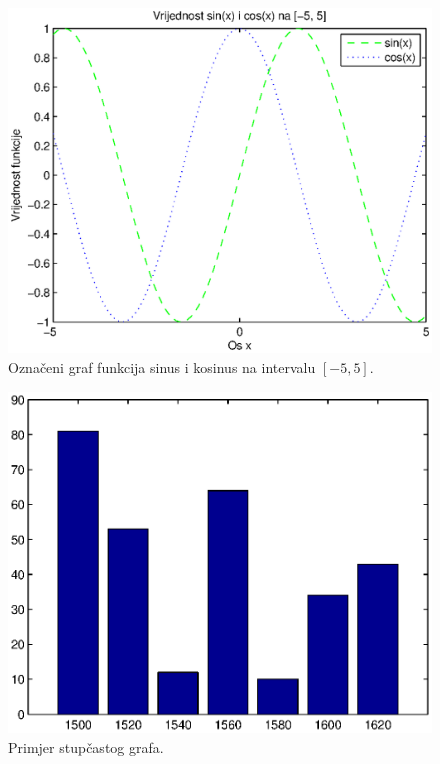 \documentclass[a4paper, 10pt]{article}
\begin{document}
\begin{figure}[!htb]
\centering
\includegraphics[width=\linewidth]{slike/plot_sin_cos_oznaceno.eps}
\caption{Označeni graf funkcija sinus i kosinus na intervalu $[-5, 5]$.}
\label{fig:plot_sin_cos_oznaceno}
\end{figure}

\begin{figure}[!htb]
\centering
\includegraphics[width=\linewidth]{slike/bar_1.eps}
\caption{Primjer stupčastog grafa.}
\label{fig:bar_1}
\end{figure}
\end{document}
